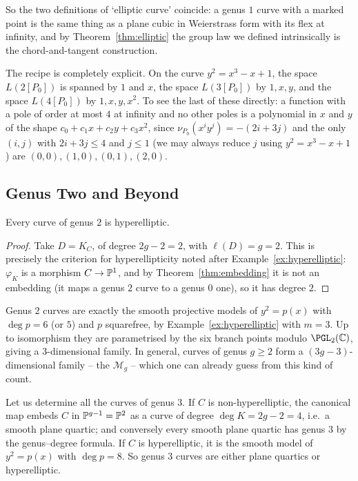 \documentclass[a4paper]{scrartcl}
\begin{document}
So the two definitions of `elliptic curve' coincide: a genus $1$ curve with a marked point is the same thing as a plane cubic in Weierstrass form with its flex at infinity, and by Theorem~\ref{thm:elliptic} the group law we defined intrinsically is the chord-and-tangent construction.

\begin{example}
	The recipe is completely explicit. On the curve $y^2 = x^3-x+1$, the space $L(2[P_0])$ is spanned by $1$ and $x$, the space $L(3[P_0])$ by $1,x,y$, and the space $L(4[P_0])$ by $1,x,y,x^2$. To see the last of these directly: a function with a pole of order at most $4$ at infinity and no other poles is a polynomial in $x$ and $y$ of the shape $c_0 + c_1x + c_2y + c_3x^2$, since $\nu_{P_0}(x^iy^j) = -(2i+3j)$ and the only $(i,j)$ with $2i+3j \leq 4$ and $j \leq 1$ (we may always reduce $j$ using $y^2 = x^3-x+1$) are $(0,0),(1,0),(0,1),(2,0)$.
\end{example}

\subsection{Genus Two and Beyond}

\begin{proposition}
	Every curve of genus $2$ is hyperelliptic.
\end{proposition}

\begin{proof}
	Take $D = K_C$, of degree $2g-2 = 2$, with $\ell(D) = g = 2$. This is precisely the criterion for hyperellipticity noted after Example~\ref{ex:hyperelliptic}: $\varphi_{K}$ is a morphism $C \to \mathbb{P}^1$, and by Theorem~\ref{thm:embedding} it is not an embedding (it maps a genus $2$ curve to a genus $0$ one), so it has degree $2$.
\end{proof}

\begin{example}
	Genus $2$ curves are exactly the smooth projective models of $y^2 = p(x)$ with $\deg p = 6$ (or $5$) and $p$ squarefree, by Example~\ref{ex:hyperelliptic} with $m = 3$. Up to isomorphism they are parametrised by the six branch points modulo $\PGL_2(\C)$, giving a $3$-dimensional family. In general, curves of genus $g \geq 2$ form a $(3g-3)$-dimensional family -- the  $\mathcal M_g$ -- which one can already guess from this kind of count.
\end{example}

\begin{example}
	Let us determine all the curves of genus $3$. If $C$ is non-hyperelliptic, the canonical map embeds $C$ in $\mathbb{P}^{g-1} = \mathbb{P}^2$ as a curve of degree $\deg K = 2g-2 = 4$, i.e.\ a smooth plane quartic; and conversely every smooth plane quartic has genus $3$ by the genus--degree formula. If $C$ is hyperelliptic, it is the smooth model of $y^2 = p(x)$ with $\deg p = 8$. So genus $3$ curves are either plane quartics or hyperelliptic.
\end{example}
\end{document}
